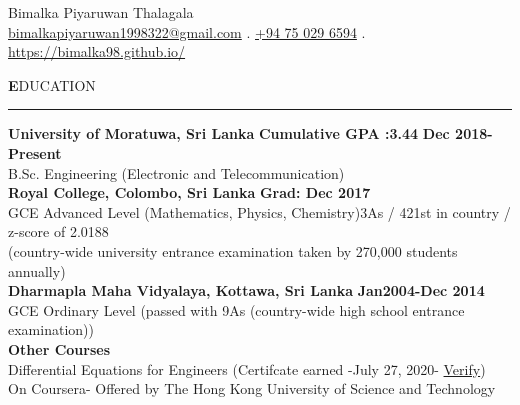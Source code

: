 \documentclass[legalpaper,11pt]{article}
\begin{document}
\begin{center}
	{\Huge Bimalka Piyaruwan Thalagala}\\
	\href{https://mail.google.com/mail/u/0/?view=cm&fs=1&tf=1&source=mailto&to=bimalkapiyaruwan1998322@gmail.com}{bimalkapiyaruwan1998322@gmail.com} %
	. \href{https://wa.me/94750296594/}{+94 75 029 6594} %
	. \url{https://bimalka98.github.io/}
\end{center}
\vspace{5mm}


\textbf{\Large E}DUCATION

\vspace{2mm}\hrule\vspace{5mm}
\setlength{\leftskip}{5mm}

\textbf{\large University of Moratuwa, Sri Lanka}\hspace{2cm} \textbf{\large Cumulative GPA :3.44} \hfill \textbf{\large Dec 2018-Present}\\
B.Sc. Engineering (Electronic and Telecommunication)\\

\textbf{\large Royal College, Colombo, Sri Lanka} \hfill \textbf{\large Grad: Dec 2017}\\
GCE Advanced Level (Mathematics, Physics, Chemistry)\hfill 3As / 421st in country / z-score of 2.0188\\
(country-wide university entrance examination taken by 270,000 students annually)\\

\textbf{\large Dharmapla Maha Vidyalaya, Kottawa, Sri Lanka} \hfill \textbf{\large Jan2004-Dec 2014}\\
GCE Ordinary Level (passed with 9As (country-wide high school entrance examination))\\

\textbf{\large Other Courses}\\
Differential Equations for Engineers  \hfill(Certifcate earned -July 27, 2020- \href{https://coursera.org/share/5a90715745c310c0df94b0a38195d912}{Verify})\\
\hspace{5mm}On Coursera- Offered by The Hong Kong University of Science and Technology\\
\end{document}
